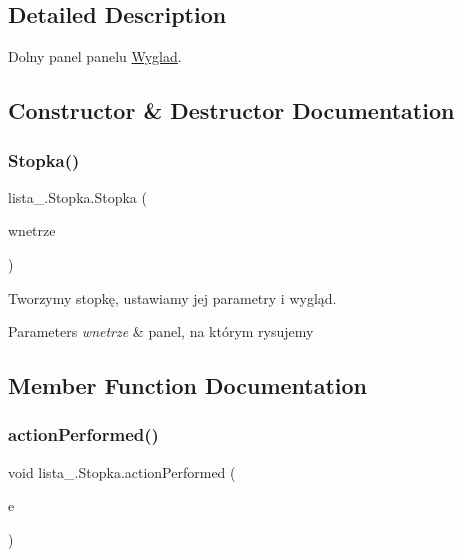 \subsection{Detailed Description}
Dolny panel panelu \mbox{\hyperlink{classlista__5_1_1_wyglad}{Wyglad}}. 

\subsection{Constructor \& Destructor Documentation}
\mbox{\label{classlista__5_1_1_stopka_aca2946bc95b1b607793c5e57fc2ed995}} 
\subsubsection{\texorpdfstring{Stopka()}{Stopka()}}
{\footnotesize\ttfamily lista\+\_.\+Stopka.\+Stopka (\begin{DoxyParamCaption}\item[{\mbox{\hyperlink{classlista__5_1_1_wnetrze}{Wnetrze}}}]{wnetrze }\end{DoxyParamCaption})}

Tworzymy stopkę, ustawiamy jej parametry i wygląd. 
\begin{DoxyParams}{Parameters}
{\em wnetrze} & panel, na którym rysujemy \\
\hline
\end{DoxyParams}


\subsection{Member Function Documentation}
\mbox{\label{classlista__5_1_1_stopka_a6cce6029ebcb4c780c78442687aadd8f}} 
\subsubsection{\texorpdfstring{action\+Performed()}{actionPerformed()}}
{\footnotesize\ttfamily void lista\+\_.\+Stopka.\+action\+Performed (\begin{DoxyParamCaption}\item[{Action\+Event}]{e }\end{DoxyParamCaption})}


